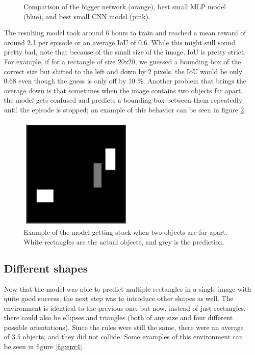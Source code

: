 \documentclass[
  digital,     %
  oneside,     %
  nosansbold,  %
  nocolorbold, %
  lof,         %
  lot,         %
]{fithesis4}
\begin{document}
\begin{figure}
    \centering
    \makebox[\textwidth][c]{}
    \caption{Comparison of the bigger network (orange), best small MLP model (blue), and best small CNN model (pink).}
    \label{fig:v3_bigger_net}
\end{figure}

The resulting model took around 6 hours to train and reached a mean reward of around 2.1 per episode or an average IoU of 0.6. While this might still sound pretty bad, note that because of the small size of the image, IoU is pretty strict. For example, if for a rectangle of size 20x20, we guessed a bounding box of the correct size but shifted to the left and down by 2 pixels, the IoU would be only 0.68 even though the guess is only off by 10  \%. Another problem that brings the average down is that sometimes when the image contains two objects far apart, the model gets confused and predicts a bounding box between them repeatedly until the episode is stopped; an example of this behavior can be seen in figure \ref{fig:v3_stuck}.

\begin{figure}
    \centering
    \includegraphics[width=0.5\linewidth]{results/v3_stuck.png}
    \caption{Example of the model getting stuck when two objects are far apart. White rectangles are the actual objects, and grey is the prediction.}
    \label{fig:v3_stuck}
\end{figure}

\subsection{Different shapes}
Now that the model was able to predict multiple rectangles in a single image with quite good success, the next step was to introduce other shapes as well. The environment is identical to the previous one, but now, instead of just rectangles, there could also be ellipses and triangles (both of any size and four different possible orientations). Since the rules were still the same, there were an average of 3.5 objects, and they did not collide. Some examples of this environment can be seen in figure \ref{fig:env4}.
\end{document}

